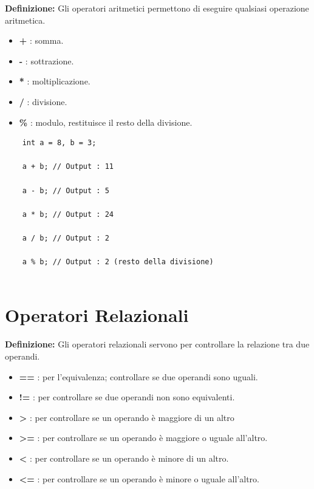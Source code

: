 \textsf{\small \textbf{Definizione: } Gli operatori aritmetici permettono di eseguire qualsiasi operazione aritmetica.} \\

\begin{itemize}
	\item \textsf{\small \textbf{+} : somma.}
	\item \textsf{\small \textbf{-} : sottrazione.}
	\item \textsf{\small \textbf{*} : moltiplicazione.}
	\item \textsf{\small \textbf{/} : divisione.}
	\item \textsf{\small \textbf{\%} : modulo, restituisce il resto della divisione.}
\end{itemize}

\begin{lstlisting}
	int a = 8, b = 3;
	
	a + b; // Output : 11
	
	a - b; // Output : 5
	
	a * b; // Output : 24
	
	a / b; // Output : 2
	
	a % b; // Output : 2 (resto della divisione)
	
\end{lstlisting}


\section{Operatori Relazionali}

\textsf{\small \textbf{Definizione: } Gli operatori relazionali servono per controllare la relazione tra due operandi. } \\

\begin{itemize}
	\item \textsf{\small \textbf{==} : per l'equivalenza; controllare se due operandi sono uguali.}
	\item \textsf{\small \textbf{!=} : per controllare se due operandi non sono equivalenti.}
	\item \textsf{\small \textbf{>} : per controllare se un operando è maggiore di un altro}
	\item \textsf{\small \textbf{>=} : per controllare se un operando è maggiore o uguale all'altro.}
	\item \textsf{\small \textbf{<} : per controllare se un operando è minore di un altro.}
	\item \textsf{\small \textbf{<=} : per controllare se un operando è minore o uguale all'altro.}
\end{itemize}

